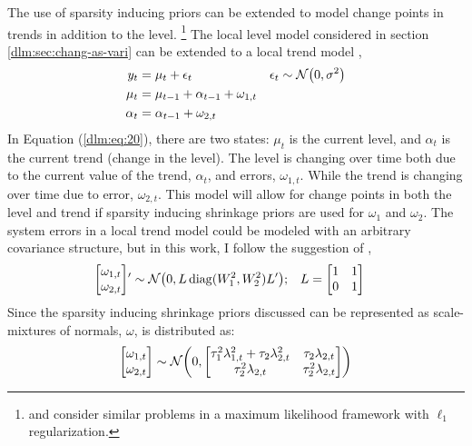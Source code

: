 The use of sparsity inducing priors can be extended to model change points in trends in addition to the level.%
\footnote{\textcite{KimKohBoydEtAl2009} and \textcite{Tibshirani2014} consider similar problems in a maximum likelihood framework with $\ell_{1}$ regularization.}
The local level model considered in section \ref{dlm:sec:chang-as-vari} can be extended to a local trend model \parencites[Ch 3.2]{DurbinKoopman2012}[Ch 7]{WestHarrison1997},
\begin{equation}
  \label{dlm:eq:20}
  \begin{aligned}[t]
    y_{t} &= \mu_{t} + \epsilon_{t} & \epsilon_{t} & \sim \mathcal{N}\mathopen{}\left(0, \sigma^{2}\right)\mathclose{} \\
    \mu_{t} &= \mu_{t - 1} + \alpha_{t - 1} + \omega_{1, t} \\
    \alpha_{t} &= \alpha_{t - 1} + \omega_{2, t} 
  \end{aligned}
\end{equation}
In Equation (\ref{dlm:eq:20}), there are two states: $\mu_{t}$ is the current level, and $\alpha_{t}$ is the current trend (change in the level).
The level is changing over time both due to the current value of the trend, $\alpha_{t}$, and errors, $\omega_{1,t}$.
While the trend is changing over time due to error, $\omega_{2,t}$.
This model will allow for change points in both the level and trend if sparsity inducing shrinkage priors are used for $\omega_{1}$ and $\omega_{2}$.
The system errors in a local trend model could be modeled with an arbitrary covariance structure, but in this work, I follow the suggestion of \parencite[Ch 7.]{WestHarrison1997},
\begin{equation}
  \label{dlm:eq:29}
  \begin{aligned}[t]
  \begin{bmatrix}
    \omega_{1, t} \\
    \omega_{2, t}
  \end{bmatrix} 
  & '\sim \mathcal{N}\mathopen{}\left(0,
    L \operatorname{diag}(W_{1}^{2}, W_{2}^{2}) L'
  \right)\mathclose{} ; &
  L &= 
  \begin{bmatrix}
    1 & 1 \\
    0 & 1 
  \end{bmatrix}
  \end{aligned}
\end{equation}
Since the sparsity inducing shrinkage priors discussed can be represented as scale-mixtures of normals, $\omega$, is distributed as:
\begin{equation}
\label{dlm:eq:26}
\begin{bmatrix}
  \omega_{1, t} \\
  \omega_{2, t}
\end{bmatrix}
\sim \mathcal{N}\mathopen{}\left(0,
  \begin{bmatrix}
    \tau_{1}^{2} \lambda_{1, t}^{2} + \tau_{2} \lambda_{2, t}^{2} & \tau_{2} \lambda_{2, t} \\
    \tau_{2}^{2} \lambda_{2, t} & \tau_{2}^{2} \lambda_{2, t}
  \end{bmatrix}
\right)\mathclose{}
\end{equation}



